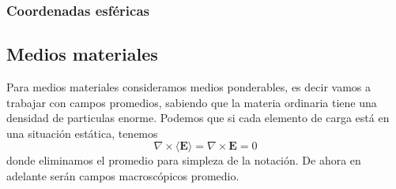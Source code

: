 \documentclass[a4paper]{article}
\numberwithin{equation}{section} %
\renewcommand{\vec}[1]{\boldsymbol{#1}}
\begin{document}
\subsubsection{Coordenadas esféricas}


\subsection{Medios materiales}
Para medios materiales consideramos medios ponderables, es decir vamos a trabajar con campos promedios, sabiendo que la materia ordinaria tiene una densidad de particulas enorme.
Podemos que si cada elemento de carga está en una situación estática, tenemos
\begin{equation}
\nabla \times \langle \vec{E} \rangle = \nabla \times \vec{E} = 0
\end{equation}
donde eliminamos el promedio para simpleza de la notación. De ahora en adelante serán campos macroscópicos promedio.
\end{document}
